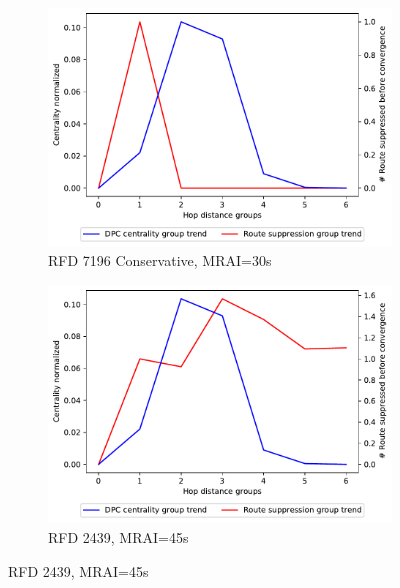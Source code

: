 \begin{figure}[H]
\begin{subfigure}[b]{0.325\textwidth}
     \end{subfigure}
     \hfill
     \begin{subfigure}[b]{0.325\textwidth}
         \centering
         \includegraphics[width=\textwidth]{images/RFD/miceVSelephants/MultiMRAI/30/elephants/cisco_1000_RFD_7196_conservative_nodeConvergence_centVSsup_trend.pdf}
         \caption{\scriptsize RFD 7196 Conservative, MRAI=30s}
         \label{fig:1000_7196RFDC_centVSsup_elephants_MRAI30}
     \end{subfigure}
     \vfill
     \begin{subfigure}[b]{0.325\textwidth}
         \centering
         \includegraphics[width=\textwidth]{images/RFD/miceVSelephants/MultiMRAI/45/elephants/cisco_1000_RFD_nodeConvergence_centVSsup_trend.pdf}
         \caption{\scriptsize RFD 2439, MRAI=45s}
         \label{fig:1000_2439RFD_centVSsup_elephants_MRAI45}

\end{subfigure}
\end{figure}

